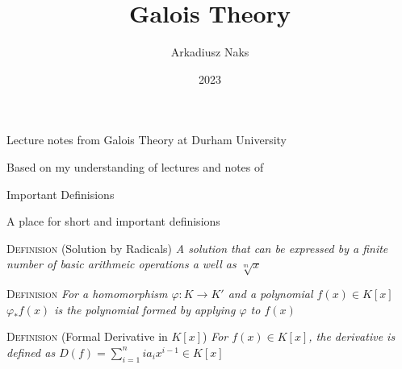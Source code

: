 \documentclass[12pt, letterpaper]{article}
\title{Galois Theory}
\author{Arkadiusz Naks}
\date{2023}
\begin{document}
\begin{titlepage}
  \begin{center}
    \makeatletter
    \vspace*{1cm}
    \Huge
    \textbf{\@title}

    \vspace{0.5cm}
    \Large
    Lecture notes from Galois Theory at Durham University

    \vspace{1.5cm}

    \textbf{\@author}

    \vfill

    \vspace{0.8cm}

    \small
    Based on my understanding of lectures and notes of \\
    \@date{}
  \end{center}
\end{titlepage}

\tableofcontents
\newpage

\begin{section}{Important Definisions}

  A place for short and important definisions

  \textsc{Definision} (Solution by Radicals) \textit{A solution that can be
    expressed by a finite number of basic arithmeic operations a well as
    \(\sqrt[m]{x}\)}

  \textsc{Definision} \textit{For a homomorphism \(\varphi: K \to K'\) and a
    polynomial \(f(x) \in K[x]\) \(\varphi_{*} f(x)\) is the polynomial formed
    by applying \(\varphi\) to \(f(x)\)}

  \textsc{Definision} (Formal Derivative in \(K[x]\)) \textit{For \(f(x) \in
    K[x]\), the derivative is defined as \(D(f) = \sum^{n}_{i = 1} ia_{i}
    x^{i - 1} \in K[x]\)}

\end{section}
\end{document}
